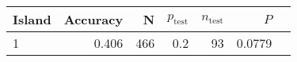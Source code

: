 
\begin{tabular}{lrrrrrl}
\toprule
Island & Accuracy & N & $p_{\mbox{test}}$ & $n_{\mbox{test}}$ & $P$ & \\
\midrule
1 & 0.406 & 466 & 0.2 & 93 & 0.0779 & \\
\bottomrule
\end{tabular}
